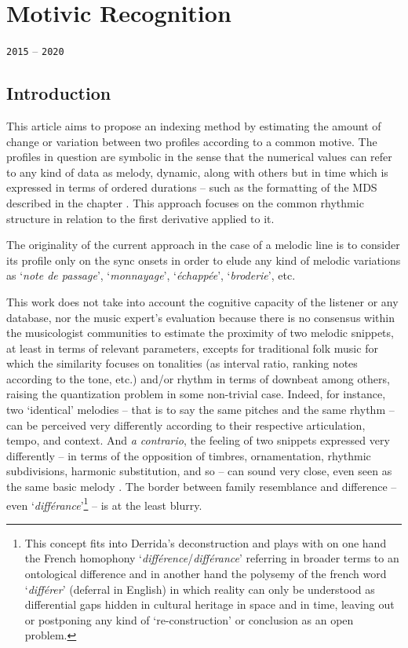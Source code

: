 \chapter{Motivic Recognition}
\thispagestyle{empty}

\label{motrec}
{\texttt{2015} -- \texttt{2020}}

\bigskip
\smallskip

\section{Introduction}
This article aims to propose an indexing method by estimating the amount of change or variation between two profiles according to a common motive. The profiles in question are symbolic in the sense that the numerical values can refer to any kind of data as melody, dynamic, along with others but in time which is expressed in terms of ordered durations -- such as the formatting of the MDS described in the chapter \textsl{}. This approach focuses on the common rhythmic structure in relation to the first derivative applied to it.

The originality of the current approach in the case of a melodic line is to consider its profile only on the sync onsets in order to elude any kind of melodic variations as `\textit{note de passage}', `\textit{monnayage}', `\textit{\'{e}chapp\'{e}e}', `\textit{broderie}', etc.

\bigskip

This work does not take into account the cognitive capacity of the listener or any database, nor the music expert's evaluation because there is no consensus within the musicologist communities to estimate the proximity of two melodic snippets, at least in terms of relevant parameters, excepts for traditional folk music for which the similarity focuses on tonalities (as interval ratio, ranking notes according to the tone, etc.) and/or rhythm in terms of downbeat among others, raising the quantization problem \citep{desqz} in some non-trivial case. Indeed, for instance, two `identical' melodies -- that is to say the same pitches and the same rhythm -- can be perceived very differently according to their respective articulation, tempo, and context. And \textit{a contrario}, the feeling of two snippets expressed very differently -- in terms of the opposition of timbres, ornamentation, rhythmic subdivisions, harmonic substitution, and so -- can sound very close, even seen as the same basic melody \citep{hfra}. The border between family resemblance and difference -- even `\textit{diff\'{e}rance}'\citep{dlg}\footnote{This concept fits into Derrida's deconstruction and plays with on one hand the French homophony `\textit{diff\'{e}rence}/\textit{diff\'{e}rance}' referring in broader terms to an ontological difference and in another hand the polysemy of the french word `\textit{diff\'{e}rer}' (deferral in English) in which reality can only be understood as differential gaps hidden in cultural heritage in space and in time, leaving out or postponing any kind of `re-construction' or conclusion as an open problem.} -- is at the least blurry.

